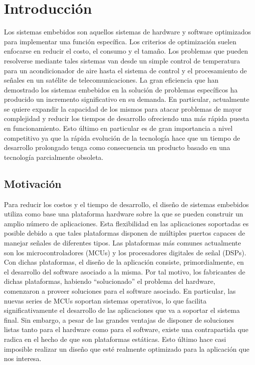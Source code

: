 \chapter{Introducción}

Los sistemas embebidos son aquellos sistemas de hardware y software optimizados para
implementar una función específica. Los criterios de optimización
suelen enfocarse en reducir el costo, el consumo y el tamaño. Los
problemas que pueden resolverse mediante tales sistemas van desde un
simple control de temperatura para un acondicionador de aire hasta el
sistema de control y el procesamiento de señales en un satélite de
telecomunicaciones. La gran eficiencia que han demostrado los sistemas
embebidos en la solución de problemas específicos ha producido un
incremento significativo en su demanda. En particular, actualmente se
quiere expandir la capacidad de los mismos para atacar problemas de
mayor complejidad y reducir los tiempos de desarrollo ofreciendo una
más rápida puesta en funcionamiento. Esto último en particular es de
gran importancia a nivel competitivo ya que la rápida evolución de la
tecnología hace que un tiempo de desarrollo prolongado tenga como
consecuencia un producto basado en una tecnología parcialmente
obsoleta.

\section{Motivación}

Para reducir los costos y el tiempo de desarrollo, el diseño de
sistemas embebidos utiliza como base una plataforma hardware sobre la
que se pueden construir un amplio número de aplicaciones. Esta
flexibilidad en las aplicaciones soportadas es posible debido
a que tales plataformas disponen de múltiples puertos capaces de
manejar señales de diferentes tipos. Las plataformas más comunes
actualmente son los microcontroladores (MCUs) y los procesadores
digitales de señal (DSPs). Con dichas plataformas, el diseño de la
aplicación consiste, primordialmente, en el desarrollo del software
asociado a la misma. Por tal motivo, los fabricantes de dichas
plataformas, habiendo ``solucionado'' el problema del hardware, comenzaron a proveer soluciones para el software asociado. En particular, las nuevas series de MCUs soportan sistemas
operativos, lo que facilita significativamente el desarrollo de las
aplicaciones que va a soportar el sistema final. Sin embargo, a pesar
de las grandes ventajas de disponer de soluciones listas tanto para
el hardware como para el software, existe una contrapartida que radica
en el hecho de que son plataformas estáticas. Esto último hace casi
imposible realizar un diseño que esté realmente optimizado para la
aplicación que nos interesa.

